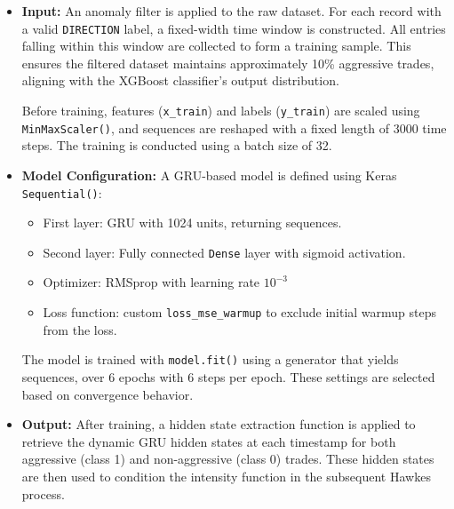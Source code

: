 \begin{itemize}
  \item \textbf{Input:}  
  An anomaly filter is applied to the raw dataset. For each record with a valid \texttt{DIRECTION} label, a fixed-width time window is constructed. All entries falling within this window are collected to form a training sample. This ensures the filtered dataset maintains approximately 10\% aggressive trades, aligning with the XGBoost classifier's output distribution.

  Before training, features (\texttt{x\_train}) and labels (\texttt{y\_train}) are scaled using \texttt{MinMaxScaler()}, and sequences are reshaped with a fixed length of 3000 time steps. The training is conducted using a batch size of 32.

  \item \textbf{Model Configuration:}  
  A GRU-based model is defined using Keras \texttt{Sequential()}:
  \begin{itemize}
    \item First layer: GRU with 1024 units, returning sequences.
    \item Second layer: Fully connected \texttt{Dense} layer with sigmoid activation.
    \item Optimizer: RMSprop with learning rate $10^{-3}$
    \item Loss function: custom \texttt{loss\_mse\_warmup} to exclude initial warmup steps from the loss.
  \end{itemize}

  The model is trained with \texttt{model.fit()} using a generator that yields sequences, over 6 epochs with 6 steps per epoch. These settings are selected based on convergence behavior.

  \item \textbf{Output:}  
  After training, a hidden state extraction function is applied to retrieve the dynamic GRU hidden states at each timestamp for both aggressive (class 1) and non-aggressive (class 0) trades. These hidden states are then used to condition the intensity function in the subsequent Hawkes process.
\end{itemize}

